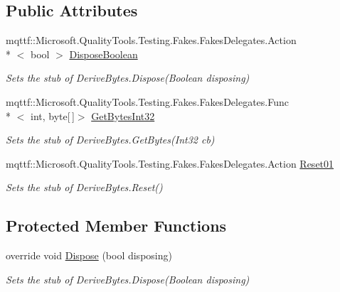 \subsection*{Public Attributes}
\begin{DoxyCompactItemize}
\item 
mqttf\-::\-Microsoft.\-Quality\-Tools.\-Testing.\-Fakes.\-Fakes\-Delegates.\-Action\\*
$<$ bool $>$ \hyperlink{class_system_1_1_security_1_1_cryptography_1_1_fakes_1_1_stub_derive_bytes_ac18d6dc91b6c3022c79e767384108bb7}{Dispose\-Boolean}
\begin{DoxyCompactList}\small\item\em Sets the stub of Derive\-Bytes.\-Dispose(\-Boolean disposing)\end{DoxyCompactList}\item 
mqttf\-::\-Microsoft.\-Quality\-Tools.\-Testing.\-Fakes.\-Fakes\-Delegates.\-Func\\*
$<$ int, byte\mbox{[}$\,$\mbox{]}$>$ \hyperlink{class_system_1_1_security_1_1_cryptography_1_1_fakes_1_1_stub_derive_bytes_ae95065d14b30024ee5e715be6afa4da2}{Get\-Bytes\-Int32}
\begin{DoxyCompactList}\small\item\em Sets the stub of Derive\-Bytes.\-Get\-Bytes(\-Int32 cb)\end{DoxyCompactList}\item 
mqttf\-::\-Microsoft.\-Quality\-Tools.\-Testing.\-Fakes.\-Fakes\-Delegates.\-Action \hyperlink{class_system_1_1_security_1_1_cryptography_1_1_fakes_1_1_stub_derive_bytes_adaedf40d28ab5befbff297f87c0f19e2}{Reset01}
\begin{DoxyCompactList}\small\item\em Sets the stub of Derive\-Bytes.\-Reset()\end{DoxyCompactList}\end{DoxyCompactItemize}
\subsection*{Protected Member Functions}
\begin{DoxyCompactItemize}
\item 
override void \hyperlink{class_system_1_1_security_1_1_cryptography_1_1_fakes_1_1_stub_derive_bytes_a7472c576ed043df54ea5bcf17ba2fc32}{Dispose} (bool disposing)
\begin{DoxyCompactList}\small\item\em Sets the stub of Derive\-Bytes.\-Dispose(\-Boolean disposing)\end{DoxyCompactList}\end{DoxyCompactItemize}
